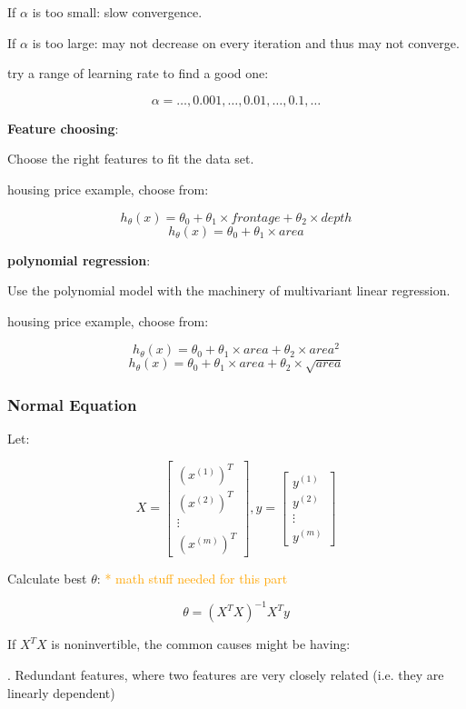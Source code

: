 \documentclass{article}
\begin{document}
\noindent If \(\alpha\) is too small: slow convergence.

\noindent If \(\alpha\) is too large: may not decrease on every iteration and thus may not converge.

\noindent try a range of learning rate to find a good one:

\[\alpha = \dots, 0.001, \dots, 0.01, \dots, 0.1, \dots\]

\noindent \textbf{Feature choosing}:

\noindent Choose the right features to fit the data set.

\noindent housing price example, choose from:

\[h_{\theta}(x) = \theta_0 + \theta_1 \times frontage + \theta_2 \times depth\]
\[h_{\theta}(x) = \theta_0 + \theta_1 \times area\]

\noindent \textbf{polynomial regression}:

\noindent Use the polynomial model with the machinery of multivariant linear regression.

\noindent housing price example, choose from:

\[h_{\theta}(x) = \theta_0 + \theta_1 \times area + \theta_2 \times area^2\]
\[h_{\theta}(x) = \theta_0 + \theta_1 \times area + \theta_2 \times \sqrt{area}\]

\subsubsection{Normal Equation}

\noindent Let:

\[
X = 
\begin{bmatrix}
(x^{(1)})^T\\
(x^{(2)})^T\\
\vdots\\
(x^{(m)})^T
\end{bmatrix}
,
y = 
\begin{bmatrix}
y^{(1)}\\
y^{(2)}\\
\vdots\\
y^{(m)}
\end{bmatrix}
\]

\noindent Calculate best \(\theta\): \textcolor{orange}{ * math stuff needed for this part}

\[
\theta = (X^TX)^{-1}X^Ty
\]

\noindent If \(X^TX\) is noninvertible, the common causes might be having:

. Redundant features, where two features are very closely related (i.e. they are linearly dependent)
\end{document}
